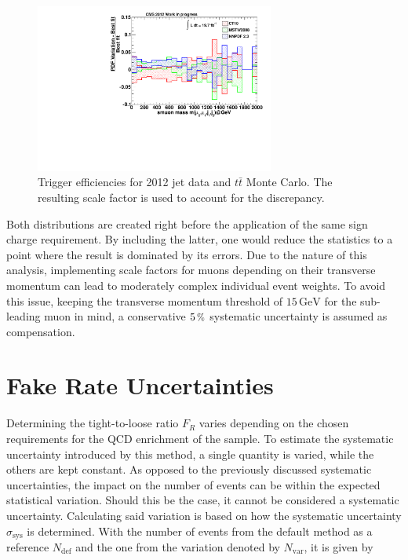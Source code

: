 \begin{figure}[!htb]
  \centering
  \includegraphics[width=0.7\textwidth]{plots/pdfratios.pdf}
  \caption{Trigger efficiencies for 2012 jet data and $t\bar{t}$ Monte Carlo. The resulting scale factor is used to account for the discrepancy.}
  \label{fig:triggereff}
\end{figure}

Both distributions are created right before the application of the same sign charge requirement. By including the latter, one would reduce the statistics to a point where the result is dominated by its errors. Due to the nature of this analysis, implementing scale factors for muons depending on their transverse momentum can lead to moderately complex individual event weights. To avoid this issue, keeping the transverse momentum threshold of $15\,\text{GeV}$ for the sub-leading muon in mind, a conservative $5\,\pct$ systematic uncertainty is assumed as compensation.

\section{Fake Rate Uncertainties}
\label{sec:tlsys}

Determining the tight-to-loose ratio $F_R$ varies depending on the chosen requirements for the QCD enrichment of the sample. To estimate the systematic uncertainty introduced by this method, a single quantity is varied, while the others are kept constant. As opposed to the previously discussed systematic uncertainties, the impact on the number of events can be within the expected statistical variation. Should this be the case, it cannot be considered a systematic uncertainty. Calculating said variation is based on how the systematic uncertainty $\sigma_{\text{sys}}$ is determined. With the number of events from the default method as a reference $N_{\text{def}}$ and the one from the variation denoted by $N_{\text{var}}$, it is given by


